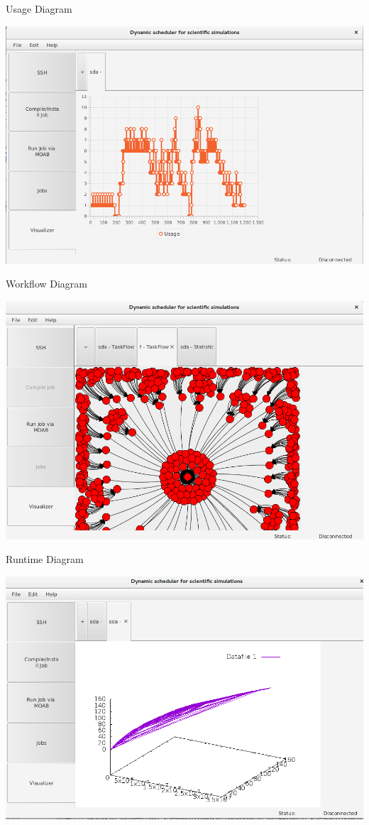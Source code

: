 \begin{frame}{Usage Diagram}
	\centerline{
		\includegraphics[scale=0.25]{images/usage}}
\end{frame}
	
\begin{frame}{Workflow Diagram}
	\centerline{
		\includegraphics[scale=0.25]{images/taskflow}}
\end{frame}

\begin{frame}{Runtime Diagram}
	\centerline{
		\includegraphics[scale=0.25]{images/runtime}}
\end{frame}
